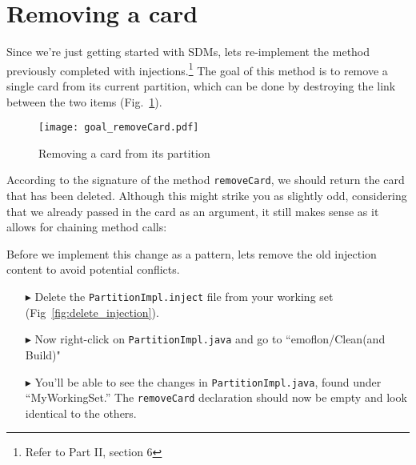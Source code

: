 \newpage
\genHeader
\section{Removing a card}
\hypertarget{sec:remCard}{}

Since we're just getting started with SDMs, lets re-implement the method previously completed with injections.\footnote{Refer to Part II, section 6} The goal of
this method is to remove a single card from its current partition, which can be done by destroying the link between the two items (Fig.~\ref{fig:goal_removeCard}).

\vspace{1cm}

\begin{figure}[htbp]
	\centering
    \texttt{[image: goal\_removeCard.pdf]}
	\caption{Removing a card from its partition}
	\label{fig:goal_removeCard}
\end{figure}
\FloatBarrier

\vspace{0.5cm}

According to the signature of the method \texttt{removeCard}, we should return the card that has been deleted. Although this might strike you as slightly odd,
considering that we already passed in the card as an argument, it still makes sense as it allows for chaining method calls:

Before we implement this change as a pattern, lets remove the old injection content to avoid potential conflicts.

\begin{itemize}

\item[$\blacktriangleright$] Delete the \texttt{PartitionImpl.inject} file from your working set (Fig~\ref{fig:delete_injection}).

\item[$\blacktriangleright$] Now right-click on \texttt{PartitionImpl.java} and go to ``emoflon/Clean(and Build)" 

\item[$\blacktriangleright$] You'll be able to see the changes in \texttt{PartitionImpl.java}, found under ``MyWorkingSet.'' The \texttt{removeCard}
declaration should now be empty and look identical to the others.

\end{itemize}

\newpage

